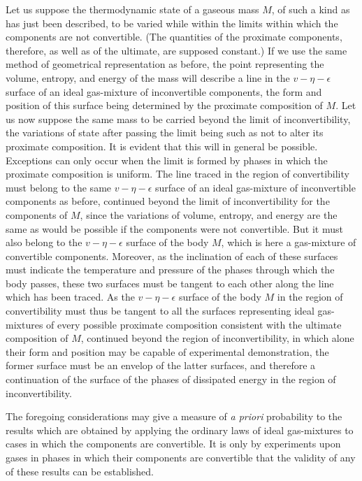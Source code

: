\documentclass[12pt]{article}
\begin{document}
Let us suppose the thermodynamic state of a gaseous mass $M$, of such a kind as has just been described, to be varied while within the limits within which the components are not convertible. (The quantities of the proximate components, therefore, as well as of the ultimate, are supposed constant.) If we use the same method of geometrical representation as before, the point representing the volume, entropy, and energy of the mass will describe a line in the $v\!-\eta\!-\epsilon$ surface of an ideal gas-mixture of inconvertible components, the form and position of this surface being determined by the proximate composition of $M$. Let us now suppose the same mass to be carried beyond the limit of inconvertibility, the variations of state after passing the limit being such as not to alter its proximate composition. It is evident that this will in general be possible. Exceptions can only occur when the limit is formed by phases in which the proximate composition is uniform. The line traced in the region of convertibility must belong to the same $v\!-\eta\!-\epsilon$ surface of an ideal gas-mixture of inconvertible components as before, continued beyond the limit of inconvertibility for the components of $M$, since the variations of volume, entropy, and energy are the same as would be possible if the components were not convertible. But it must also belong to the $v\!-\eta\!-\epsilon$ surface of the body $M$, which is here a gas-mixture of convertible components. Moreover, as the inclination of each of these surfaces must indicate the temperature and pressure of the phases through which the body passes, these two surfaces must be tangent to each other along the line which has been traced. As the $v\!-\eta\!-\epsilon$ surface of the body $M$ in the region of convertibility must thus be tangent to all the surfaces representing ideal gas-mixtures of every possible proximate composition consistent with the ultimate composition of $M$, continued beyond the region of inconvertibility, in which alone their form and position may be capable of experimental demonstration, the former surface must be an envelop of the latter surfaces, and therefore a continuation of the surface of the phases of dissipated energy in the region of inconvertibility.


The foregoing considerations may give a measure of \textit{a priori} probability to the results which are obtained by applying the ordinary laws of ideal gas-mixtures to cases in which the components are convertible. It is only by experiments upon gases in phases in which their components are convertible that the validity of any of these results can be established.
\end{document}
